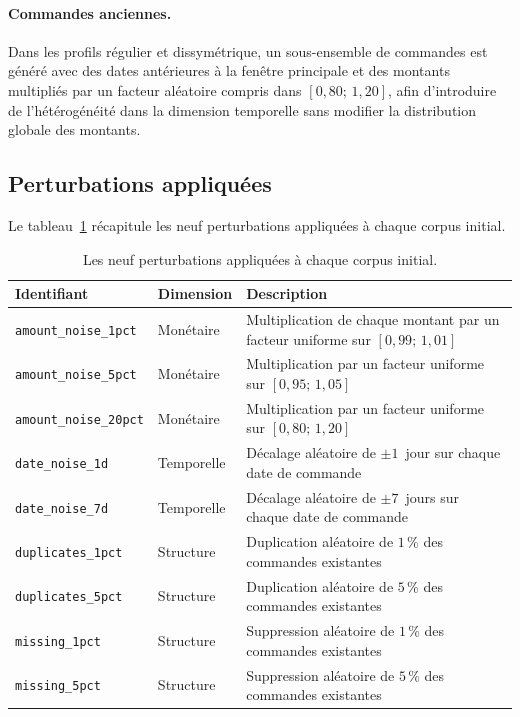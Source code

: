 \paragraph{Commandes anciennes.}
Dans les profils régulier et dissymétrique, un sous-ensemble de commandes est généré
avec des dates antérieures à la fenêtre principale et des montants multipliés par un
facteur aléatoire compris dans $[0{,}80;\, 1{,}20]$, afin d'introduire de l'hétérogénéité
dans la dimension temporelle sans modifier la distribution globale des montants.

\subsection{Perturbations appliquées}
\label{subsec:methodes-perturbations}

Le tableau~\ref{tab:methodes-perturbations} récapitule les neuf perturbations appliquées
à chaque corpus initial.

\begin{table}[htb]
  \centering
  \caption{Les neuf perturbations appliquées à chaque corpus initial.}
  \label{tab:methodes-perturbations}
  \small
  \begin{tabular}{llp{}}
    \toprule
    Identifiant & Dimension & Description \\
    \midrule
    \texttt{amount\_noise\_1pct}  & Monétaire  & Multiplication de chaque montant par un facteur uniforme sur $[0{,}99;\, 1{,}01]$ \\
    \texttt{amount\_noise\_5pct}  & Monétaire  & Multiplication par un facteur uniforme sur $[0{,}95;\, 1{,}05]$ \\
    \texttt{amount\_noise\_20pct} & Monétaire  & Multiplication par un facteur uniforme sur $[0{,}80;\, 1{,}20]$ \\
    \texttt{date\_noise\_1d}      & Temporelle & Décalage aléatoire de $\pm1$~jour sur chaque date de commande \\
    \texttt{date\_noise\_7d}      & Temporelle & Décalage aléatoire de $\pm7$~jours sur chaque date de commande \\
    \texttt{duplicates\_1pct}     & Structure  & Duplication aléatoire de $1\,\%$ des commandes existantes \\
    \texttt{duplicates\_5pct}     & Structure  & Duplication aléatoire de $5\,\%$ des commandes existantes \\
    \texttt{missing\_1pct}        & Structure  & Suppression aléatoire de $1\,\%$ des commandes existantes \\
    \texttt{missing\_5pct}        & Structure  & Suppression aléatoire de $5\,\%$ des commandes existantes \\
    \bottomrule
  \end{tabular}
\end{table}

